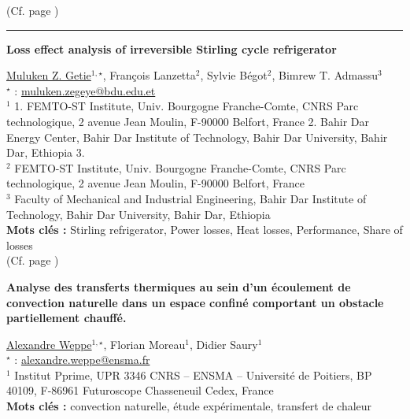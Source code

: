 \noindent(Cf. page  \pageref{ref:31})
\hrule
%
%
\begin{flushleft}
\addtocounter{section}{1}
{\Large \textbf{Loss effect analysis of irreversible Stirling cycle refrigerator}}\label{ref:35}
\end{flushleft}
%
\underline{Muluken Z. Getie}$^{1,\star}$, François Lanzetta$^{2}$, Sylvie Bégot$^{2}$, Bimrew T. Admassu$^{3}$\\[2mm]
$^{\star}$ \Letter : \url{muluken.zegeye@bdu.edu.et}\\[2mm]
{\footnotesize $^{1}$ 1.  FEMTO-ST Institute, Univ. Bourgogne Franche-Comte, CNRS Parc technologique, 2 avenue Jean Moulin, F-90000 Belfort, France            2. Bahir Dar Energy Center, Bahir Dar Institute of Technology, Bahir Dar University, Bahir Dar, Ethiopia           3.}\\
{\footnotesize $^{2}$ FEMTO-ST Institute, Univ. Bourgogne Franche-Comte, CNRS Parc technologique, 2 avenue Jean Moulin, F-90000 Belfort, France}\\
{\footnotesize $^{3}$ Faculty of Mechanical and Industrial Engineering, Bahir Dar Institute of Technology, Bahir Dar University, Bahir Dar, Ethiopia}\\
[4mm]
%
\noindent \textbf{Mots clés : } Stirling refrigerator, Power losses, Heat losses, Performance, Share of losses\\[4mm]
%

\noindent(Cf. page  \pageref{ref:35})
\clearpage
%

\begin{flushleft}
\addtocounter{section}{1}
{\Large \textbf{Analyse des transferts thermiques au sein d'un écoulement de convection naturelle  dans un espace confiné comportant un obstacle partiellement chauffé.}}\label{ref:48}
\end{flushleft}
%
\underline{Alexandre Weppe}$^{1,\star}$, Florian Moreau$^{1}$, Didier Saury$^{1}$\\[2mm]
$^{\star}$ \Letter : \url{alexandre.weppe@ensma.fr}\\[2mm]
{\footnotesize $^{1}$ Institut Pprime, UPR 3346 CNRS – ENSMA – Université de Poitiers, BP 40109, F-86961 Futuroscope Chasseneuil Cedex, France}\\
[4mm]
%
\noindent \textbf{Mots clés : } convection naturelle, étude expérimentale, transfert de chaleur\\[4mm]


